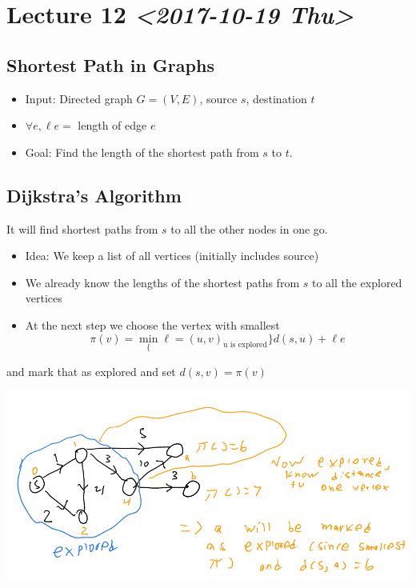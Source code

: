 \documentclass[11pt]{article}
\begin{document}
\section{Lecture 12 \textit{<2017-10-19 Thu>}}
\label{sec:orgc29f2d8}
\subsection{Shortest Path in Graphs}
\label{sec:org577c9c8}
\begin{itemize}
\item Input: Directed graph \(G=(V,E)\), source \(s\), destination \(t\)
\item \(\forall e, \ell e =\) length of edge \(e\)
\item Goal: Find the length of the shortest path from \uline{\(s\)} to \uline{\(t\)}.
\end{itemize}
\subsection{Dijkstra's Algorithm}
\label{sec:org8f6ab81}
It will find shortest paths from \(s\) to all the other nodes in one go.
\begin{itemize}
\item Idea: We keep a list of all vertices (initially includes source)
\item We already know the lengths of the shortest paths from \(s\) to all the explored vertices
\item At the next step we choose the vertex with smallest
$$\pi(v)=\min_\{\ell=(u,v)_\text{u is explored}\} d(s,u)+\ell e$$
\end{itemize}
and mark that as explored and set \(d(s,v)=\pi(v)\)
\begin{center}
\includegraphics[width=.9\linewidth]{./Images/i37.png}
\end{center}
\end{document}
